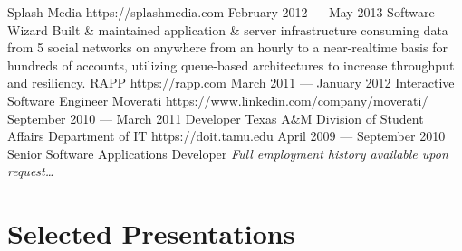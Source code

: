 \documentclass{resume}
\begin{document}
\employer
    {Splash Media}
    {https://splashmedia.com}
    {February 2012 --- May 2013}
    {Software Wizard}
    {Built \& maintained application \& server infrastructure consuming data from 5 social networks on anywhere from an hourly to a near-realtime basis for hundreds of accounts, utilizing queue-based architectures to increase throughput and resiliency.}
\employer
    {RAPP}
    {https://rapp.com}
    {March 2011 --- January 2012}
    {Interactive Software Engineer}
    {}
\employer
    {Moverati}
    {https://www.linkedin.com/company/moverati/}
    {September 2010 --- March 2011}
    {Developer}
    {}
\employer
    {Texas A\&M Division of Student Affairs Department of IT}
    {https://doit.tamu.edu}
    {April 2009 --- September 2010}
    {Senior Software Applications Developer}
    {}
\emph{Full employment history available upon request\ldots}


\section{Selected Presentations}
\end{document}
